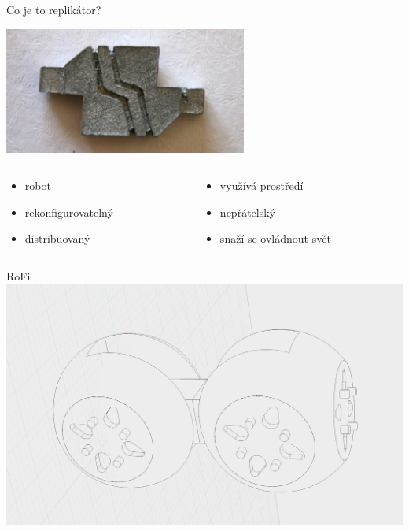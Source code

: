 \documentclass{beamer}
\begin{document}
\begin{frame}{Co je to replikátor?}
    \begin{center}
        \includegraphics[width=0.6\textwidth]{img/replicator3}
    \end{center}

    \begin{columns}
        \begin{column}{0.5\textwidth}
            \begin{itemize}
                \item robot
                \item rekonfigurovatelný
                \item distribuovaný
            \end{itemize}
        \end{column}
        \begin{column}{0.5\textwidth}
            \begin{itemize}
                \item využívá prostředí
                \item nepřátelský
                \item snaží se ovládnout svět
            \end{itemize}
        \end{column}
    \end{columns}
\end{frame}

\begin{frame}{RoFi}
    \includegraphics[width=\textwidth]{img/rofi1}
\end{frame}
\end{document}
